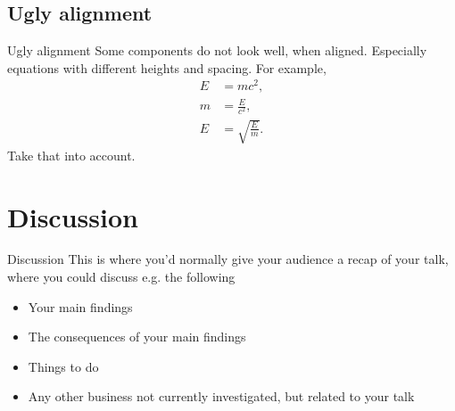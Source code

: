 \documentclass[aspectratio=169]{beamer}
\begin{document}
\subsection{Ugly alignment}
\begin{frame}{Ugly alignment}
Some components do not look well, when aligned. Especially equations with different
heights and spacing. For example,
\begin{align}
    E&=mc^2,
    \\m&=\frac{E}{c^2},
    \\E&=\sqrt{\frac{E}{m}}.
\end{align}
Take that into account.
\end{frame}

\section{Discussion}
\begin{frame}{Discussion}
    This is where you’d normally give your audience a recap of your talk, where you could
discuss e.g. the following
\begin{itemize}
     \item Your main findings
    \item The consequences of your main findings
    \item Things to do
    \item Any other business not currently investigated, but related to your talk
\end{itemize}
\end{frame}



 
\end{document}
